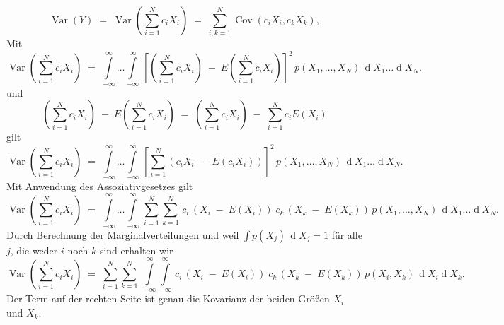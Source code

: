 \begin{equation}
\operatorname {Var}\left(Y\right) \; = \;
\operatorname {Var}\left(\sum _{{i=1}}^{N}c_i X_{i}\right) \; = \;
\sum _{{i,k=1}}^{N}\operatorname {Cov}(c_i X_{i}, c_k X_{k}),
\label{eq:VarianzSummeISTSummeKovarianz}
\end{equation}
Mit
\begin{equation*}
\operatorname {Var}\left(\sum _{{i=1}}^{N}c_i X_{i}\right) \; = \;
\int\limits_{-\infty}^{\infty} \dots \int\limits_{-\infty}^{\infty}
\, \left[ \left(\sum_{i=1}^N c_i X_i\right) \; - \; E(\sum_{i=1}^N c_i X_i) \right]^2 \, p(X_1, \dots, X_N)
\, \operatorname{d}X_1 \dots \operatorname{d}X_N .
\end{equation*}
und
$$
\left(\sum_{i=1}^N c_i X_i \right) \; - \; E\left(\sum_{i=1}^N c_i X_i\right) \; = \;
\left(\sum_{i=1}^N c_i X_i \right) \; - \; \sum_{i=1}^N c_i E(X_i)
$$
gilt
\begin{equation}
\operatorname {Var}\left(\sum _{{i=1}}^{N}c_i X_{i}\right) \; = \;
\int\limits_{-\infty}^{\infty} \dots \int\limits_{-\infty}^{\infty}
\, \left[ \sum_{i=1}^N \left(c_i X_i \; - \; E(c_i X_i)\right) \right]^2 \, p(X_1, \dots, X_N)
\, \operatorname{d}X_1 \dots \operatorname{d}X_N .
\end{equation}
Mit Anwendung des Assoziativgesetzes gilt
\begin{equation*}
\operatorname {Var}\left(\sum _{{i=1}}^{N}c_i X_{i}\right) \; = \;
\int\limits_{-\infty}^{\infty} \dots \int\limits_{-\infty}^{\infty}
\, \sum_{i=1}^N \sum_{k=1}^N \, c_i \,  \left(X_i \; - \; E(X_i)\right) \;
      c_k \, \left(X_k \; - \; E(X_k)\right) \, p(X_1, \dots, X_N)
\, \operatorname{d}X_1 \dots \operatorname{d}X_N .
\end{equation*}
Durch Berechnung der Marginalverteilungen und weil $\int p(X_j) \, \operatorname{d}X_j = 1$
für alle $j$, die weder $i$ noch $k$ sind erhalten wir
\begin{equation}
\operatorname {Var}\left(\sum _{{i=1}}^{N}c_i X_{i}\right) \; = \;
\sum_{i=1}^N \sum_{k=1}^N  \;
\int\limits_{-\infty}^{\infty} \int\limits_{-\infty}^{\infty}
\, c_i \, \left(X_i \; - \; E(X_i)\right) \;
     c_k \, \left(X_k \; - \; E(X_k)\right) \, p(X_i, X_k)
\, \operatorname{d}X_i \operatorname{d}X_k .
\end{equation}
Der Term auf der rechten Seite ist genau die Kovarianz der beiden
Größen $X_i$ und $X_k$.

